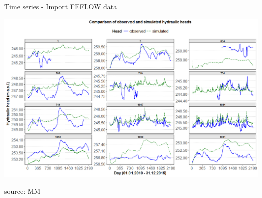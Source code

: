 \documentclass[8pt,ignorenonframetext,]{beamer}
\begin{document}
\begin{frame}{Time series - Import FEFLOW data}

\includegraphics{imgPres/time_series_head_analysis01.png}

source: MM

\end{frame}
\end{document}
